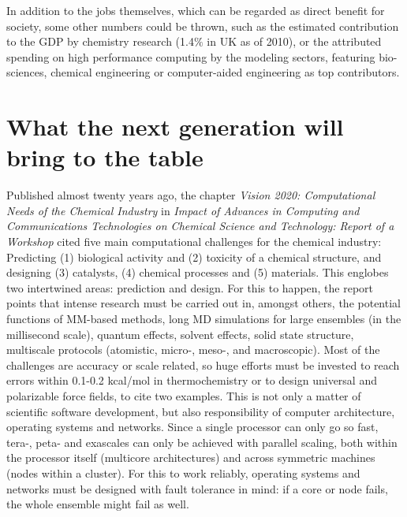 In addition to the jobs themselves, which can be regarded as direct benefit for society, some other numbers could be thrown, such as the estimated contribution to the GDP by chemistry research (1.4$\%$  in UK as of 2010\cite{UKeconomics}), or the attributed spending on high performance computing by the modeling sectors, featuring bio-sciences, chemical engineering or computer-aided engineering as top contributors.\cite{hpc2020}



\section{What the next generation will bring to the table}

Published almost twenty years ago, the chapter \textit{Vision 2020: Computational Needs of the Chemical Industry} in \textit{Impact of Advances in Computing and Communications Technologies on Chemical Science and Technology: Report of a Workshop}\cite{vision2020} cited five main computational challenges for the chemical industry: Predicting (1) biological activity and (2) toxicity of a chemical structure, and designing (3) catalysts, (4) chemical processes and (5) materials. This englobes two intertwined areas: prediction and design. For this to happen, the report points that intense research must be carried out in, amongst others, the potential functions of MM-based methods, long MD simulations for large ensembles (in the millisecond scale), quantum effects, solvent effects, solid state structure, multiscale protocols (atomistic, micro-, meso-, and macroscopic). Most of the challenges are accuracy or scale related, so huge efforts must be invested to reach errors within 0.1-0.2 kcal/mol in thermochemistry or to design universal and polarizable force fields, to cite two examples. This is not only a matter of scientific software development, but also responsibility of computer architecture, operating systems and networks. Since a single processor can only go so fast, tera-, peta- and exascales can only be achieved with parallel scaling, both within the processor itself (multicore architectures) and across symmetric machines (nodes within a cluster). For this to work reliably, operating systems and networks must be designed with fault tolerance in mind: if a core or node fails, the whole ensemble might fail as well.

